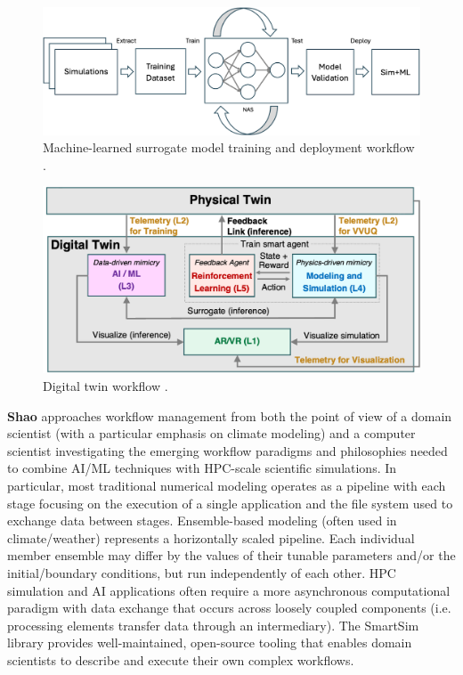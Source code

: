 \documentclass[utf8]{FrontiersinVancouver} %
\begin{document}
\begin{figure}
    \centering
    \includegraphics[width=0.8\linewidth]{images/workflow-surrogate-model.png}
    \caption{Machine-learned surrogate model training and deployment workflow \cite{brewer2023entropy}.}
    \label{fig:surrogate}
\end{figure}

\begin{figure}
    \centering
    \includegraphics[width=0.8\linewidth]{images/workflow-digital-twin.png}
    \caption{Digital twin workflow \cite{brewer2024digital}.}
    \label{fig:dt}
\end{figure}


{\bf Shao} approaches workflow management from both the point of view of a domain scientist (with a particular emphasis on climate modeling) and a computer scientist investigating the emerging workflow paradigms and philosophies needed to combine AI/ML techniques with HPC-scale scientific simulations. In particular, most traditional numerical modeling operates as a pipeline with each stage focusing on the execution of a single application and the file system used to exchange data between stages. Ensemble-based modeling (often used in climate/weather) represents a horizontally scaled pipeline. Each individual member ensemble may differ by the values of their tunable parameters and/or the initial/boundary conditions, but run independently of each other. HPC simulation and AI applications often require a more asynchronous computational paradigm with data exchange that occurs across loosely coupled components (i.e. processing elements transfer data through an intermediary). The SmartSim library provides well-maintained, open-source tooling that enables domain scientists to describe and execute their own complex workflows.
\end{document}
